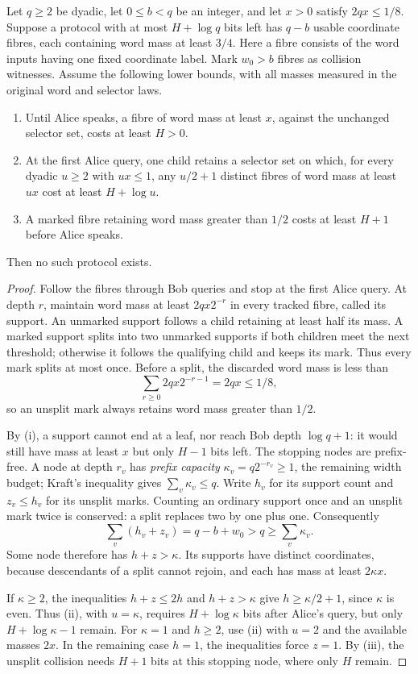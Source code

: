\documentclass[11pt]{article} \usepackage[utf8]{inputenc}
\theoremstyle{plain} \newtheorem{theorem}{Theorem}[section]
\theoremstyle{definition} \newaliascnt{definition}{theorem}
\begin{document}
\begin{lemma}\label{lem:collision-tracking}
Let $q\ge2$ be dyadic, let $0\le b<q$ be an integer, and let $x>0$
satisfy $2qx\le1/8$.
Suppose a protocol with at most
$H+\log q$ bits left has $q-b$ usable coordinate fibres, each containing
word mass at least $3/4$. Here a fibre consists of the word inputs having one
fixed coordinate label. Mark $w_0>b$ fibres as collision witnesses.
Assume the following lower bounds, with all masses measured in the original
word and selector laws.
\begin{enumerate}
\item[(i)] Until Alice speaks, a fibre of word mass at least $x$, against the
unchanged selector set, costs at least $H>0$.
\item[(ii)] At the first Alice query, one child retains a selector set on which,
for every dyadic $u\ge2$ with $ux\le1$, any $u/2+1$ distinct fibres
of word mass at least $ux$ cost at least $H+\log u$.
\item[(iii)] A marked fibre retaining word mass greater than $1/2$ costs at least
$H+1$ before Alice speaks.
\end{enumerate}
Then no such protocol exists.
\end{lemma}
\begin{proof}
Follow the fibres through Bob queries and stop at the first Alice query.
At depth $r$, maintain word mass at least $2qx2^{-r}$ in every tracked
fibre, called its support. An unmarked support follows a child retaining
at least half its mass. A marked support splits into two unmarked supports
if both children meet the next threshold; otherwise it follows the qualifying
child and keeps its mark. Thus every mark splits at most once. Before a split,
the discarded word mass is less than
\[
\sum_{r\ge0}2qx2^{-r-1}=2qx\le1/8,
\]
so an unsplit mark always retains word mass greater than $1/2$.

By (i), a support cannot end at a leaf, nor reach Bob depth $\log q+1$:
it would still have mass at least $x$ but only $H-1$ bits left.
The stopping nodes are prefix-free. A node at depth $r_v$ has
\emph{prefix capacity} $\kappa_v=q2^{-r_v}\ge1$, the remaining width budget;
Kraft's inequality gives $\sum_v\kappa_v\le q$.
Write $h_v$ for its support count and $z_v\le h_v$ for its unsplit marks.
Counting an ordinary support once and an unsplit mark twice is conserved:
a split replaces two by one plus one. Consequently
\[
\sum_v(h_v+z_v)=q-b+w_0>q\ge\sum_v\kappa_v.
\]
Some node therefore has $h+z>\kappa$. Its supports have distinct coordinates,
because descendants of a split cannot rejoin, and each has mass at least
$2\kappa x$.

If $\kappa\ge2$, the inequalities $h+z\le2h$ and $h+z>\kappa$ give
$h\ge\kappa/2+1$, since $\kappa$ is even. Thus (ii), with $u=\kappa$, requires
$H+\log\kappa$ bits after Alice's query, but only
$H+\log\kappa-1$ remain. For $\kappa=1$ and $h\ge2$, use (ii) with
$u=2$ and the available masses $2x$. In the remaining case $h=1$,
the inequalities force $z=1$. By (iii), the unsplit collision needs
$H+1$ bits at this stopping node, where only $H$ remain.
\end{proof}
\end{document}
